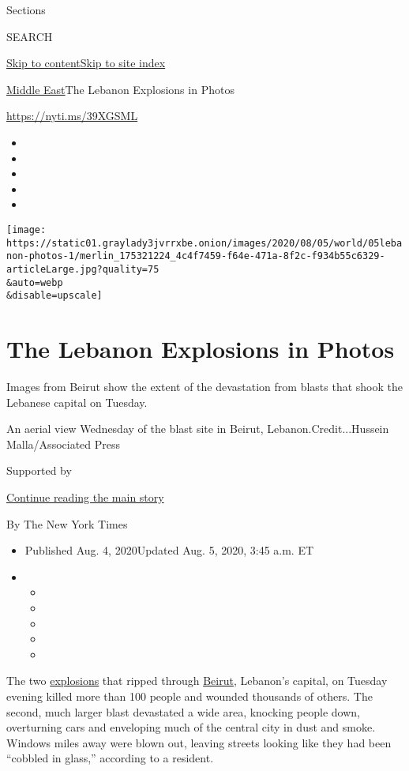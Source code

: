 Sections

SEARCH

\protect\hyperlink{site-content}{Skip to
content}\protect\hyperlink{site-index}{Skip to site index}

\href{/section/world/middleeast}{Middle East}\textbar{}The Lebanon
Explosions in Photos

\url{https://nyti.ms/39XGSML}

\begin{itemize}
\item
\item
\item
\item
\item
\end{itemize}

\texttt{[image: https://static01.graylady3jvrrxbe.onion/images/2020/08/05/world/05lebanon-photos-1/merlin\_175321224\_4c4f7459-f64e-471a-8f2c-f934b55c6329-articleLarge.jpg?quality=75\\\&auto=webp\\\&disable=upscale]}

\hypertarget{the-lebanon-explosions-in-photos}{%
\section{The Lebanon Explosions in
Photos}\label{the-lebanon-explosions-in-photos}}

Images from Beirut show the extent of the devastation from blasts that
shook the Lebanese capital on Tuesday.

An aerial view Wednesday of the blast site in Beirut,
Lebanon.Credit...Hussein Malla/Associated Press

Supported by

\protect\hyperlink{after-sponsor}{Continue reading the main story}

By The New York Times

\begin{itemize}
\item
  Published Aug. 4, 2020Updated Aug. 5, 2020, 3:45 a.m. ET
\item
  \begin{itemize}
  \item
  \item
  \item
  \item
  \item
  \end{itemize}
\end{itemize}

The two
\href{https://www.nytimes3xbfgragh.onion/2020/08/05/world/middleeast/beirut-explosion.html}{explosions}
that ripped through
\href{https://www.nytimes3xbfgragh.onion/2020/08/04/world/middleeast/lebanon-explosion-beirut.html}{Beirut},
Lebanon's capital, on Tuesday evening killed more than 100 people and
wounded thousands of others. The second, much larger blast devastated a
wide area, knocking people down, overturning cars and enveloping much of
the central city in dust and smoke. Windows miles away were blown out,
leaving streets looking like they had been ``cobbled in glass,''
according to a resident.

